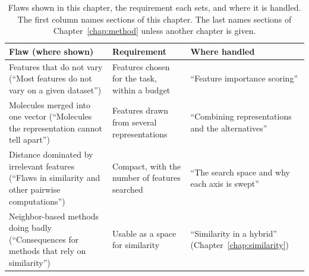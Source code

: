 \begin{table}[htbp]
\centering
\small
\caption[Flaws of standard representations and similarity, and the requirement each sets.]{Flaws shown in this chapter, the requirement each sets, and where it is handled. The first column names sections of this chapter. The last names sections of Chapter~\ref{chap:method} unless another chapter is given.}
\label{tab:flaws:requirements}
\begin{adjustbox}{max width=\textwidth}
\begin{tabular}{P{0.34\textwidth}P{0.30\textwidth}P{0.28\textwidth}}
\toprule
Flaw (where shown) & Requirement & Where handled \\
\midrule
Features that do not vary (``Most features do not vary on a given dataset'') & Features chosen for the task, within a budget & ``Feature importance scoring'' \\
Molecules merged into one vector (``Molecules the representation cannot tell apart'') & Features drawn from several representations & ``Combining representations and the alternatives'' \\
Distance dominated by irrelevant features (``Flaws in similarity and other pairwise computations'') & Compact, with the number of features searched & ``The search space and why each axis is swept'' \\
Neighbor-based methods doing badly (``Consequences for methods that rely on similarity'') & Usable as a space for similarity & ``Similarity in a hybrid'' (Chapter~\ref{chap:similarity}) \\
\bottomrule
\end{tabular}
\end{adjustbox}
\end{table}


